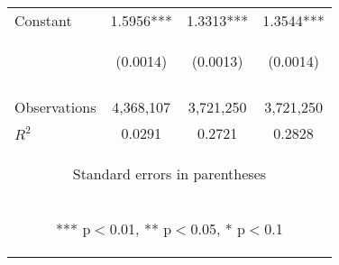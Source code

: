 \begin{center}
\begin{tabular}{lccc}
Constant & 1.5956*** & 1.3313*** & 1.3544*** \\
 & \begin{footnotesize}(0.0014)\end{footnotesize} & \begin{footnotesize}(0.0013)\end{footnotesize} & \begin{footnotesize}(0.0014)\end{footnotesize} \\
\vspace{4pt} & \begin{footnotesize}\end{footnotesize} & \begin{footnotesize}\end{footnotesize} & \begin{footnotesize}\end{footnotesize} \\
Observations & 4,368,107 & 3,721,250 & 3,721,250 \\
 $R^2$ & 0.0291 & 0.2721 & 0.2828 \\ \hline
\multicolumn{4}{c}{\begin{footnotesize} Standard errors in parentheses\end{footnotesize}} \\
\multicolumn{4}{c}{\begin{footnotesize} *** p$<$0.01, ** p$<$0.05, * p$<$0.1\end{footnotesize}} \\
\end{tabular}
\end{center}
